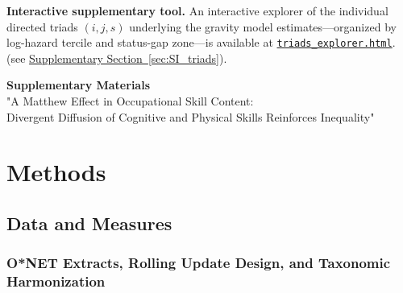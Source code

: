\documentclass[11pt, letterpaper]{article} %
\begin{document}
\textbf{Interactive supplementary tool.} An interactive explorer of the individual directed triads $(i,j,s)$ underlying the gravity model estimates---organized by log-hazard tercile and status-gap zone---is available at \href{https://anonymous.4open.science/w/skill_diffusion_replication-7857/triads_explorer.html}{\nolinkurl{triads_explorer.html}}. (see \hyperref[sec:SI_triads]{Supplementary Section~\ref*{sec:SI_triads}}).

\clearpage



\clearpage
\appendix

\renewcommand{\thesection}{S\arabic{section}}
\renewcommand{\thesubsection}{S\arabic{section}.\arabic{subsection}}
\renewcommand{\thesubsubsection}{S\arabic{section}.\arabic{subsection}.\arabic{subsubsection}}
\renewcommand{\thetable}{SM\arabic{table}}
\renewcommand{\thefigure}{SM\arabic{figure}}
\setcounter{section}{0}
\setcounter{table}{0}
\setcounter{figure}{0}

\renewcommand{\contentsname}{Supplementary Materials --- Table of Contents}
\tableofcontents
\vspace{1cm}

\clearpage

\begin{center}
    {\large\textbf{Supplementary Materials}}\\[0.5em]
    {\normalsize "A Matthew Effect in Occupational Skill Content: \\
    Divergent Diffusion of Cognitive and Physical Skills Reinforces Inequality"}
\end{center}
\vspace{1em}

\section{Methods}

\subsection{Data and Measures}

\subsubsection{O*NET Extracts, Rolling Update Design, and Taxonomic Harmonization}
\label{sec:SI_onet}
 
\end{document}
